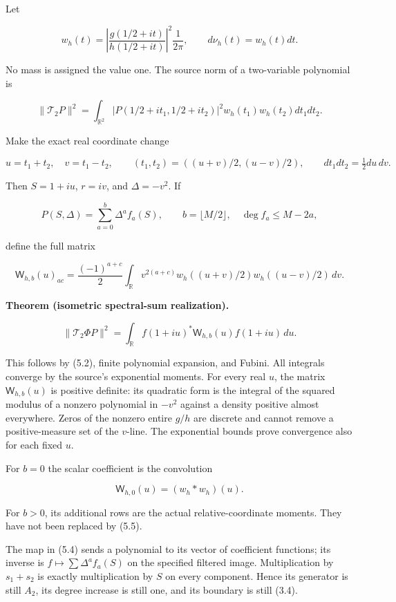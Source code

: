 \documentclass[
]{article}
\begin{document}
Let

\[w_h(t)=\left|\frac{g(1/2+it)}{h(1/2+it)}\right|^2\frac1{2\pi},\qquad d\nu_h(t)=w_h(t)dt.\tag{5.1}\]

No mass is assigned the value one. The source norm of a two-variable
polynomial is

\[\|\mathcal T_2P\|^2=\int_{\mathbb R^2}|P(1/2+it_1,1/2+it_2)|^2w_h(t_1)w_h(t_2)dt_1dt_2.\]

Make the exact real coordinate change

\[u=t_1+t_2,\quad v=t_1-t_2,\qquad
(t_1,t_2)=((u+v)/2,(u-v)/2),\qquad dt_1dt_2=\tfrac12du\,dv.\tag{5.2}\]

Then \(S=1+iu\), \(r=iv\), and \(\Delta=-v^2\). If

\[P(S,\Delta)=\sum_{a=0}^{b}\Delta^a f_a(S),\qquad b=\lfloor M/2\rfloor,\quad\deg f_a\le M-2a,\]

define the full matrix

\[\boxed{\mathsf W_{h,b}(u)_{ac}
=\frac{(-1)^{a+c}}2\int_{\mathbb R}v^{2(a+c)}
w_h((u+v)/2)w_h((u-v)/2)\,dv.}\tag{5.3}\]

\textbf{Theorem (isometric spectral-sum realization).}

\[\boxed{\|\mathcal T_2\Phi P\|^2
=\int_{\mathbb R}f(1+iu)^*\mathsf W_{h,b}(u)f(1+iu)\,du.}\tag{5.4}\]

This follows by (5.2), finite polynomial expansion, and Fubini. All
integrals converge by the source's exponential moments. For every real
\(u\), the matrix \(\mathsf W_{h,b}(u)\) is positive definite: its
quadratic form is the integral of the squared modulus of a nonzero
polynomial in \(-v^2\) against a density positive almost everywhere.
Zeros of the nonzero entire \(g/h\) are discrete and cannot remove a
positive-measure set of the \(v\)-line. The exponential bounds prove
convergence also for each fixed \(u\).

For \(b=0\) the scalar coefficient is the convolution

\[\mathsf W_{h,0}(u)=(w_h*w_h)(u).\tag{5.5}\]

For \(b>0\), its additional rows are the actual relative-coordinate
moments. They have not been replaced by (5.5).

The map in (5.4) sends a polynomial to its vector of coefficient
functions; its inverse is \(f\mapsto\sum\Delta^af_a(S)\) on the
specified filtered image. Multiplication by \(s_1+s_2\) is exactly
multiplication by \(S\) on every component. Hence its generator is still
\(A_2\), its degree increase is still one, and its boundary is still
(3.4).
\end{document}
